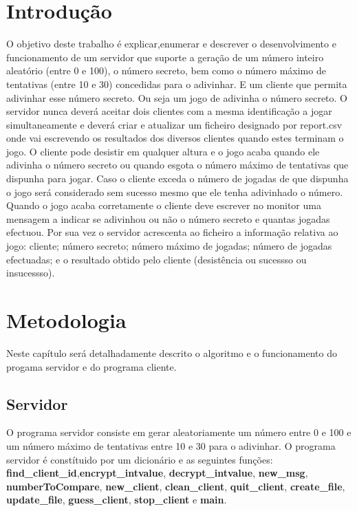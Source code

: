 \documentclass{report}
\begin{document}
\tableofcontents


\clearpage
{}

\chapter{Introdução}
\label{chap.introducao}
O objetivo deste trabalho é explicar,enumerar e descrever o desenvolvimento e funcionamento de um servidor que suporte a geração de um número inteiro aleatório (entre 0 e 100), o número secreto, bem como o número máximo de tentativas (entre 10 e 30) concedidas para o adivinhar. E um cliente que permita adivinhar esse número secreto. Ou seja um jogo de adivinha o número secreto.
O servidor nunca deverá aceitar dois clientes com a mesma identificação a jogar simultaneamente e deverá criar e atualizar um ficheiro designado por report.csv onde vai escrevendo os resultados dos diversos clientes quando estes terminam o jogo. O cliente pode desistir em qualquer altura e o jogo acaba quando ele adivinha o número secreto ou quando esgota o número máximo de tentativas que dispunha para jogar. Caso o cliente exceda o número de jogadas de que dispunha o jogo será considerado sem sucesso mesmo que ele tenha adivinhado o número. Quando o jogo acaba corretamente o cliente deve escrever no monitor uma mensagem a indicar se adivinhou ou não o número secreto e quantas jogadas efectuou. Por sua vez o servidor acrescenta ao ficheiro a informação relativa ao jogo: cliente; número secreto; número máximo de jogadas; número de jogadas efectuadas; e o resultado obtido pelo cliente (desistência ou sucessso ou insucessso).

\chapter{Metodologia}
\label{chap.metodologia}
Neste capítulo será detalhadamente descrito o algoritmo e o funcionamento do progama servidor e do programa cliente.
\section{Servidor}
O programa servidor consiste em gerar aleatoriamente um número entre 0 e 100 e um número máximo de tentativas entre 10 e 30 para o adivinhar. 
	O programa servidor é constítuido por um dicionário e as seguintes funções: \textbf{find\_client\_id},\textbf{encrypt\_intvalue}, \textbf{decrypt\_intvalue}, \textbf{new\_msg}, \textbf{numberToCompare}, \textbf{new\_client}, \textbf{clean\_client}, \textbf{quit\_client}, \textbf{create\_file}, \textbf{update\_file}, \textbf{guess\_client}, \textbf{stop\_client} e \textbf{main}.
\end{document}

